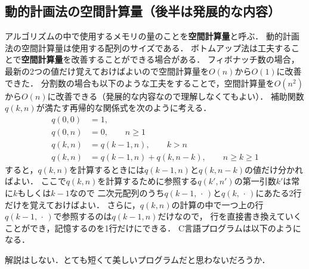 \documentclass[a4paper,twoside,onecolumn,openany,article]{memoir}
\theoremstyle{remark}
\begin{document}
\subsection{動的計画法の空間計算量（後半は発展的な内容）}\label{sec:space}
アルゴリズムの中で使用するメモリの量のことを\textbf{空間計算量}と呼ぶ．
動的計画法の空間計算量は使用する配列のサイズである．
ボトムアップ法は工夫することで\textbf{空間計算量}を改善することができる場合がある．
フィボナッチ数の場合，最新の2つの値だけ覚えておけばよいので空間計算量を$O(n)$から$O(1)$に改善できた．
分割数の場合も以下のような工夫をすることで，空間計算量を$O(n^2)$から$O(n)$に改善できる（発展的な内容なので理解しなくてもよい）．
補助関数$q(k,n)$が満たす再帰的な関係式を次のように考える．
\begin{align*}
q(0,0) &= 1,\\
q(0,n) &= 0,\qquad n \ge 1\\
q(k,n) &= q(k-1,n),\qquad k > n\\
q(k,n) &= q(k-1,n) + q(k, n-k),\qquad n\ge k\ge 1
\end{align*}
すると，$q(k,n)$を計算するときには$q(k-1,n)$と$q(k,n-k)$の値だけ分かればよい．
ここで$q(k,n)$を計算するために参照する$q(k',n')$の第一引数$k'$は常に$k$もしくは$k-1$なので
二次元配列のうち$q(k-1,\,\cdot\,)$と$q(k,\,\cdot\,)$にあたる2行だけを覚えておけばよい．
さらに，$q(k,n)$の計算の中で一つ上の行$q(k-1,\,\cdot\,)$で参照するのは$q(k-1,n)$だけなので，
行を直接書き換えていくことができ，記憶するのを1行だけにできる．
C言語プログラムは以下のようになる．

解説はしない．とても短くて美しいプログラムだと思わないだろうか．

\end{document}
